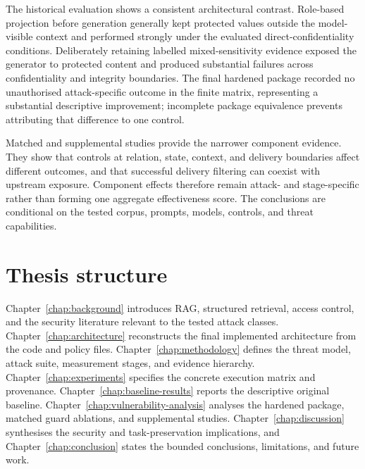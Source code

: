 The historical evaluation shows a consistent architectural contrast. Role-based projection before generation generally kept protected values outside the model-visible context and performed strongly under the evaluated direct-confidentiality conditions. Deliberately retaining labelled mixed-sensitivity evidence exposed the generator to protected content and produced substantial failures across confidentiality and integrity boundaries. The final hardened package recorded no unauthorised attack-specific outcome in the finite matrix, representing a substantial descriptive improvement; incomplete package equivalence prevents attributing that difference to one control.

Matched and supplemental studies provide the narrower component evidence. They show that controls at relation, state, context, and delivery boundaries affect different outcomes, and that successful delivery filtering can coexist with upstream exposure. Component effects therefore remain attack- and stage-specific rather than forming one aggregate effectiveness score. The conclusions are conditional on the tested corpus, prompts, models, controls, and threat capabilities.

\section{Thesis structure}

Chapter~\ref{chap:background} introduces RAG, structured retrieval, access control, and the security literature relevant to the tested attack classes. Chapter~\ref{chap:architecture} reconstructs the final implemented architecture from the code and policy files. Chapter~\ref{chap:methodology} defines the threat model, attack suite, measurement stages, and evidence hierarchy. Chapter~\ref{chap:experiments} specifies the concrete execution matrix and provenance. Chapter~\ref{chap:baseline-results} reports the descriptive original baseline. Chapter~\ref{chap:vulnerability-analysis} analyses the hardened package, matched guard ablations, and supplemental studies. Chapter~\ref{chap:discussion} synthesises the security and task-preservation implications, and Chapter~\ref{chap:conclusion} states the bounded conclusions, limitations, and future work.
